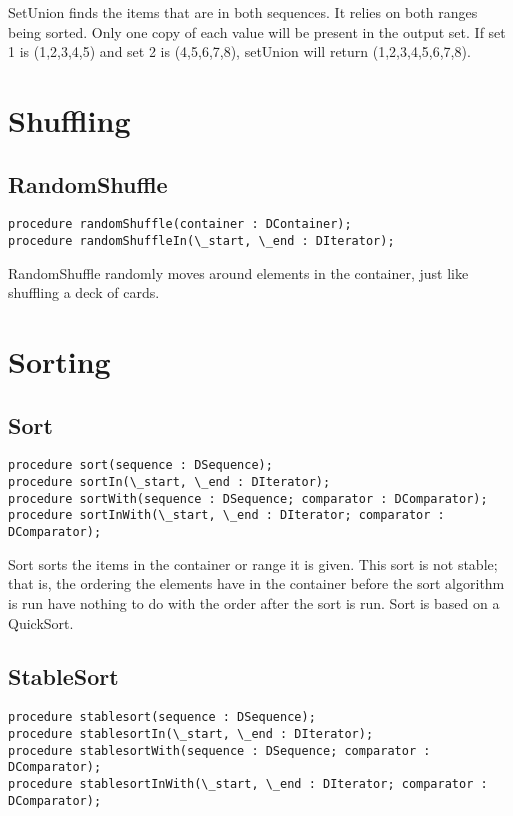 \documentclass{report}
\begin{document}
SetUnion finds the items that are in both sequences.  It relies on both
ranges being sorted. Only one copy of each value will be present in the
output set. If set 1 is (1,2,3,4,5) and set 2 is (4,5,6,7,8), setUnion will
return (1,2,3,4,5,6,7,8).

\section{Shuffling}

\subsection{RandomShuffle}

\begin{lstlisting}
procedure randomShuffle(container : DContainer);
procedure randomShuffleIn(\_start, \_end : DIterator);
\end{lstlisting}

RandomShuffle randomly moves around elements in the container, 
just like shuffling a deck of cards.

\section{Sorting}

\subsection{Sort}

\begin{lstlisting}
procedure sort(sequence : DSequence);
procedure sortIn(\_start, \_end : DIterator);
procedure sortWith(sequence : DSequence; comparator : DComparator);
procedure sortInWith(\_start, \_end : DIterator; comparator : DComparator);
\end{lstlisting}

Sort sorts the items in the container or range it is given. This sort is not
stable; that is, the ordering the elements have in the container before the
sort algorithm is run have nothing to do with the order after the sort is
run. Sort is based on a QuickSort.

\subsection{StableSort}

\begin{lstlisting}
procedure stablesort(sequence : DSequence);
procedure stablesortIn(\_start, \_end : DIterator);
procedure stablesortWith(sequence : DSequence; comparator : DComparator);
procedure stablesortInWith(\_start, \_end : DIterator; comparator : DComparator);
\end{lstlisting}
\end{document}
